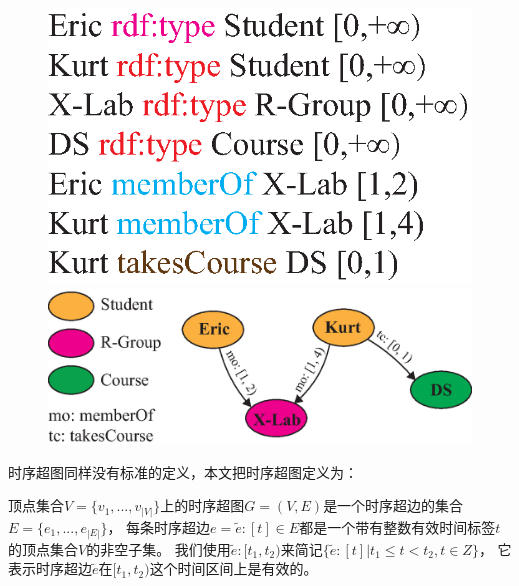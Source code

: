\begin{figure}[htb]
\centering
\begin{minipage}{.35\linewidth}
\centering\includegraphics[scale=0.5]{figures/trdfdata.eps}
\end{minipage}
\begin{minipage}{.55\linewidth}
\centering\includegraphics[scale=0.5]{figures/trdf.eps}
\end{minipage}
\begin{minipage}{1\linewidth}
\label{trdf}
\end{minipage}
\end{figure}

时序超图同样没有标准的定义，本文把时序超图定义为：

\begin{definition}[时序超图]
  顶点集合$V=\{v_1,...,v_{|V|}\}$上的时序超图$G=(V,E)$是一个时序超边的集合$E=\{e_1,...,e_{|E|}\}$，
  每条时序超边$e=\widetilde{e}:[t]\in E $都是一个带有整数有效时间标签$t$的顶点集合$V$的非空子集。
  我们使用$\widetilde{e}:[t_1,t_2)$来简记$\{\widetilde{e}:[t]|t_1\leq t<t_2,t\in Z\}$，
  它表示时序超边$\widetilde{e}$在$[t_1,t_2)$这个时间区间上是有效的。
\end{definition}


